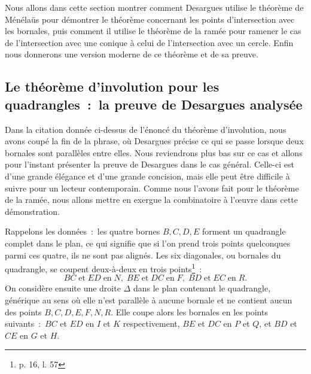 \documentclass[12pt, a4paper]{article}
\begin{document}
Nous allons dans cette section montrer comment Desargues utilise le théorème de Ménélaüs pour démontrer le théorème concernant les points d'intersection avec les bornales, puis comment il utilise le théorème de la ramée pour ramener le cas de l'intersection avec une conique à celui de l'intersection avec un cercle. Enfin nous donnerons une version moderne de ce théorème et de sa preuve.
\subsection{Le théorème d'involution pour les quadrangles~:~la preuve de Desargues analysée}
Dans la citation donnée ci-dessus de l'énoncé du théorème d'involution, nous avons coupé la fin de la phrase, où Desargues précise ce qui se passe lorsque deux bornales sont parallèles entre elles. Nous reviendrons plus bas sur ce cas et allons pour l'instant présenter la preuve de Desargues dans le cas général. Celle-ci est d'une grande élégance et d'une grande concision, mais elle peut être difficile à suivre pour un lecteur contemporain. Comme nous l'avons fait pour le théorème de la ramée, nous allons mettre en exergue la combinatoire à l'{\oe}uvre dans cette démonstration.

Rappelons les données~:~les quatre bornes $B,C,D,E$ forment un quadrangle complet dans le plan, ce qui signifie que si l'on prend trois points quelconques parmi ces quatre, ils ne sont pas alignés. Les six diagonales, ou bornales du quadrangle, se coupent deux-à-deux en trois points\footnote{p. 16, l. 57}~:~
\[
BC\;\mbox{et}\; ED \;\mbox{en}\; N,\; BE\;\mbox{et}\; DC\;\mbox{en}\;F, \; BD\;\mbox{et}\; EC\;\mbox{en}\;R.
\]
On considère ensuite une droite $\Delta$ dans le plan contenant le quadrangle, générique au sens où elle n'est parallèle à aucune bornale et ne contient  aucun des points $B,C,D,E,F,N,R$. Elle coupe alors les bornales en les points suivants~:~$BC$ et $ED$ en $I$ et $K$ respectivement, $BE$ et $DC$ en $P$ et $Q$, et $BD$ et $CE$ en $G$ et $H$.
\end{document}
